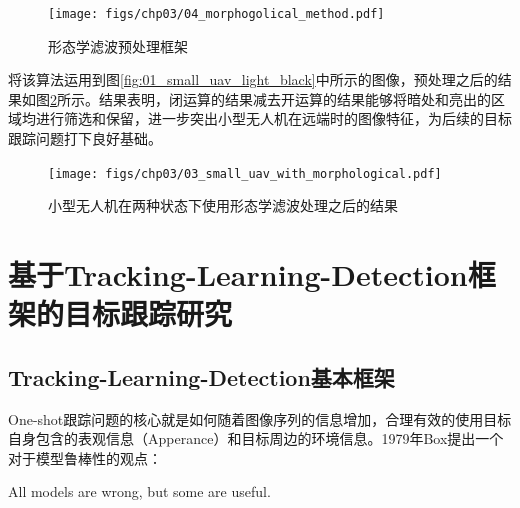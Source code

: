 \begin{figure}[ht]   
	\centering
	\texttt{[image: figs/chp03/04\_morphogolical\_method.pdf]}
	\caption{形态学滤波预处理框架}
	\label{fig:04_morphogolical_method}
\end{figure}

将该算法运用到图\ref{fig:01_small_uav_light_black}中所示的图像，预处理之后的结果如图\ref{fig:03_small_uav_with_morphological}所示。结果表明，闭运算的结果减去开运算的结果能够将暗处和亮出的区域均进行筛选和保留，进一步突出小型无人机在远端时的图像特征，为后续的目标跟踪问题打下良好基础。

\begin{figure}[ht]   
	\centering
	\texttt{[image: figs/chp03/03\_small\_uav\_with\_morphological.pdf]}
	\caption{小型无人机在两种状态下使用形态学滤波处理之后的结果}
	\label{fig:03_small_uav_with_morphological}
\end{figure}




\section{基于Tracking-Learning-Detection框架的目标跟踪研究}
\subsection{Tracking-Learning-Detection基本框架}
One-shot跟踪问题的核心就是如何随着图像序列的信息增加，合理有效的使用目标自身包含的表观信息（Apperance）和目标周边的环境信息。1979年Box提出一个对于模型鲁棒性的观点\cite{box1979robustness}：

\begin{center}
All models are wrong, but some are useful.
\end{center} 



